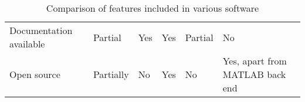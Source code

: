 \begin{table}[H]
{{\begin{tabular}{C{2.5cm} | C{3cm} C{3cm} C{3cm} C{3cm} C{3cm} }
                            Documentation available     & Partial                           & Yes                                           & Yes            & Partial       & No                                              \\
                            Open source                 & Partially                         & No                                            & Yes            & No            & {\small Yes, apart from MATLAB back end}                 \\
                        \end{tabular}}}
                        \caption{Comparison of features included in various software}\label{table:features}
                    \end{table}
